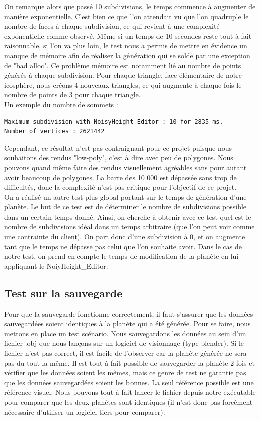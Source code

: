 \documentclass[a4paper]{article}
\begin{document}
On remarque alors que passé 10 subdivisions, le temps commence à augmenter de manière exponentielle. C'est bien ce que l'on attendait vu que l'on quadruple le nombre de faces à chaque subdivision, ce qui revient à une complexité exponentielle comme observé. Même si un temps de 10 secondes reste tout à fait raisonnable, si l'on va plus loin, le test nous a permis de mettre en évidence un manque de mémoire afin de réaliser la génération qui se solde par une exception de "bad alloc". Ce problème mémoire est notamment lié au nombre de points générés à chaque subdivision. Pour chaque triangle, face élémentaire de notre icosphère, nous créons 4 nouveaux triangles, ce qui augmente à chaque fois le nombre de points de 3 pour chaque triangle.\\

Un exemple du nombre de sommets :
\begin{lstlisting}[caption= Résultat des tests unitaires]
Maximum subdivision with NoisyHeight_Editor : 10 for 2835 ms.
Number of vertices : 2621442
\end{lstlisting}

Cependant, ce résultat n'est pas contraignant pour ce projet puisque nous souhaitons des rendus "low-poly", c'est à dire avec peu de polygones. Nous pouvons quand même faire des rendus visuellement agréables sans pour autant avoir beaucoup de polygones. La barre des 10 000 est dépassée sans trop de difficultés, donc la complexité n'est pas critique pour l'objectif de ce projet.\\
\newpage
On a réalisé un autre test plus global portant sur le temps de génération d'une planète.
Le but de ce test est de déterminer le nombre de subdivisions possible dans un certain temps donné. Ainsi, on cherche à obtenir avec ce test quel est le nombre de subdivisions idéal dans un temps arbitraire (que l'on peut voir comme une contrainte du client). On part donc d'une subdivision à 0, et on augmente tant que le temps ne dépasse pas celui que l'on souhaite avoir. Dans le cas de notre test, on prend en compte le temps de modification de la planète en lui appliquant le NoiyHeight\_Editor.

\subsection{Test sur la sauvegarde}

Pour que la sauvegarde fonctionne correctement, il faut s'assurer que les données sauvegardées soient identiques à la planète qui a été générée. Pour se faire, nous mettons en place un test scénario. Nous sauvegardons les données au sein d'un fichier .obj que nous lançons sur un logiciel de visionnage (type blender). Si le fichier n'est pas correct, il est facile de l'observer car la planète générée ne sera pas du tout la même. Il est tout à fait possible de sauvegarder la planète 2 fois et vérifier que les données soient les mêmes, mais ce genre de test ne garantie pas que les données sauvegardées soient les bonnes. La seul référence possible est une référence visuel. Nous pouvons tout à fait lancer le fichier depuis notre exécutable pour comparer que les deux planètes sont identiques (il n'est donc pas forcément nécessaire d'utiliser un logiciel tiers pour comparer).
\end{document}
